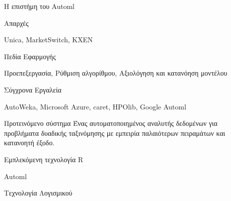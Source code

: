 \documentclass{beamer}
\begin{document}
  \begin{frame}{Η επιστήμη του Automl}
  	\begin{minipage}[t]{.4\textwidth}  		
  		Απαρχές
  		\vspace{4ex}
  	\end{minipage}%
  	  	\begin{minipage}[t]{.5\textwidth}
  	  		Unica, MarketSwitch, KXEN  	
  	  		\vspace{4ex}
  	  	\end{minipage}
  	\begin{minipage}[t]{.4\textwidth}  		
  		Πεδία Εφαρμογής
  		\vspace{4ex}
  	\end{minipage}%
  	\begin{minipage}[t]{.5\textwidth}
  		Προεπεξεργασία, Ρύθμιση αλγορίθμου, Αξιολόγηση και κατανόηση μοντέλου
  		\vspace{4ex} 
  	\end{minipage}
  	\begin{minipage}[t]{.4\textwidth}  		
  		Σύγχρονα Εργαλεία
  		\vspace{4ex}
  	\end{minipage}%
	\begin{minipage}[t]{.5\textwidth}
  		AutoWeka, Microsoft Azure, caret, HPOlib, Google Automl
  		\vspace{4ex}
  	\end{minipage}
  \end{frame}
  
  \begin{frame} {Προτεινόμενο σύστημα}
  	Ένας \alert{αυτοματοποιημένος} αναλυτής δεδομένων για προβλήματα δυαδικής ταξινόμησης με \alert{εμπειρία} παλαιότερων πειραμάτων και \alert{κατανοητή} έξοδο.
  	
  \end{frame}
  
  \begin{frame} {Εμπλεκόμενη τεχνολογία}
  	R
  	
  	Automl
  	
  	Τεχνολογία Λογισμικού
  	
  \end{frame}
\end{document}
